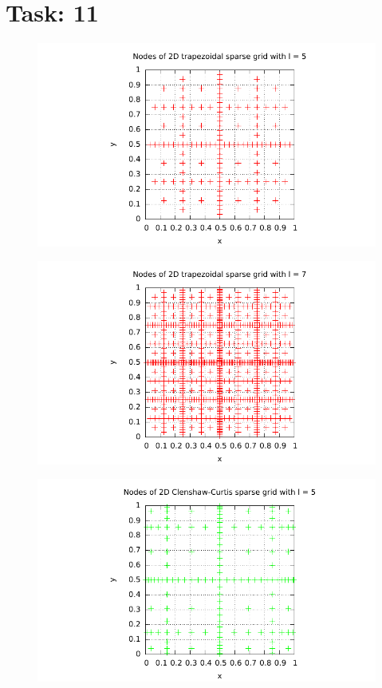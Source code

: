 \documentclass{article}
\begin{document}
\newpage
\section*{Task: 11}
\begin{figure}[htbp]
  \centering
     \includegraphics[width=1.0\textwidth]{../Task11/sh3_task11_point_plot_trapezoidal_l=5.pdf}
\end{figure}

\begin{figure}[htbp]
  \centering
     \includegraphics[width=1.0\textwidth]{../Task11/sh3_task11_point_plot_trapezoidal_l=7.pdf}
\end{figure}
\newpage
\begin{figure}[htbp]
  \centering
     \includegraphics[width=1.0\textwidth]{../Task11/sh3_task11_point_plot_clenshawCurtis_l=5.pdf}
\end{figure}
\end{document}
